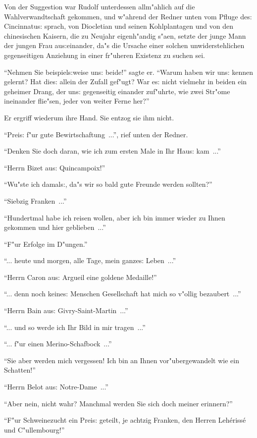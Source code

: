 \documentclass[oneside,12pt]{book}
\newcommand{\s}{s:}%
\begin{document}
Von der Suggestion war Rudolf unterdessen allm"ahlich auf die
Wahlverwandtschaft gekommen, und w"ahrend der Redner unten vom
Pfluge de{\s} Cincinnatu{\s} sprach, von Diocletian und seinen
Kohlplantagen und von den chinesischen Kaisern, die zu Neujahr
eigenh"andig s"aen, setzte der junge Mann der jungen Frau
au{\s}einander, da"s die Ursache einer solchen unwiderstehlichen
gegenseitigen Anziehung in einer fr"uheren Existenz zu suchen sei.

"`Nehmen Sie beispiel{\s}weise un{\s} beide!"' sagte er. "`Warum
haben wir un{\s} kennen gelernt? Hat die{\s} allein der Zufall
gef"ugt? War e{\s} nicht vielmehr in beiden ein geheimer Drang,
der un{\s} gegenseitig einander zuf"uhrte, wie zwei Str"ome
ineinander flie"sen, jeder von weiter Ferne her?"'

Er ergriff wiederum ihre Hand. Sie ent\/zog sie ihm nicht.

"`Prei{\s} f"ur gute Bewirtschaftung~..."', rief unten der Redner.

"`Denken Sie doch daran, wie ich zum ersten Male in Ihr Hau{\s}
kam~..."'

"`Herrn Bizet au{\s} Quincampoix!"'

"`Wu"ste ich damal{\s}, da"s wir so bald gute Freunde werden
sollten?"'

"`Siebzig Franken~..."'

"`Hundertmal habe ich reisen wollen, aber ich bin immer wieder zu
Ihnen gekommen und hier geblieben~..."'

"`F"ur Erfolge im D"ungen."'

"`... heute und morgen, alle Tage, mein ganze{\s} Leben~..."'

"`Herrn Caron au{\s} Argueil eine goldene Medaille!"'

"`... denn noch keine{\s} Menschen Gesellschaft hat mich so
v"ollig bezaubert~..."'

"`Herrn Bain au{\s} Givry-Saint-Martin~..."'

"`... und so werde ich Ihr Bild in mir tragen~..."'

"`... f"ur einen Merino-Schafbock~..."'

"`Sie aber werden mich vergessen! Ich bin an Ihnen
vor"ubergewandelt wie ein Schatten!"'

"`Herrn Belot au{\s} Notre-Dame~..."'

"`Aber nein, nicht wahr? Manchmal werden Sie sich doch meiner
erinnern?"'

"`F"ur Schweinezucht ein Prei{\s} geteilt, je achtzig Franken, den
Herren Leh\'eriss\'e und C"ullembourg!"'
\end{document}
